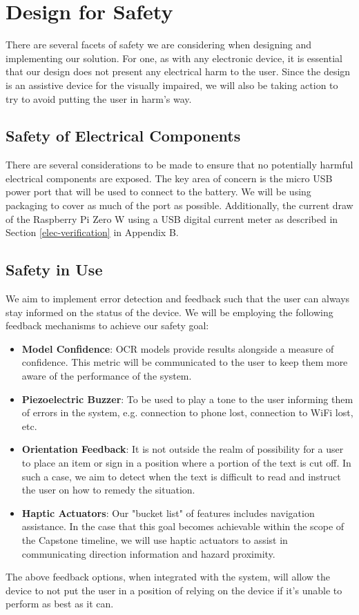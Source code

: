 \documentclass[a4paper,11pt]{article}
\begin{document}
\section{Design for Safety}
\noindent
There are several facets of safety we are considering when designing and implementing our solution. For one, as with any electronic device, it is essential that our design does not present any electrical harm to the user. Since the design is an assistive device for the visually impaired, we will also be taking action to try to avoid putting the user in harm's way.

\subsection{Safety of Electrical Components}
\noindent
There are several considerations to be made to ensure that no potentially harmful electrical components are exposed. The key area of concern is the micro USB power port that will be used to connect to the battery. We will be using packaging to cover as much of the port as possible. Additionally, the current draw of the Raspberry Pi Zero W using a USB digital current meter as described in Section \ref{elec-verification} in Appendix B.

\subsection{Safety in Use}
\noindent
We aim to implement error detection and feedback such that the user can always stay informed on the status of the device. We will be employing the following feedback mechanisms to achieve our safety goal:
\begin{itemize}
    \item \textbf{Model Confidence}: OCR models provide results alongside a measure of confidence. This metric will be communicated to the user to keep them more aware of the performance of the system.
    \item \textbf{Piezoelectric Buzzer}: To be used to play a tone to the user informing them of errors in the system, e.g. connection to phone lost, connection to WiFi lost, etc.
    \item \textbf{Orientation Feedback}: It is not outside the realm of possibility for a user to place an item or sign in a position where a portion of the text is cut off. In such a case, we aim to detect when the text is difficult to read and instruct the user on how to remedy the situation.
    \item \textbf{Haptic Actuators}: Our "bucket list" of features includes navigation assistance. In the case that this goal becomes achievable within the scope of the Capstone timeline, we will use haptic actuators to assist in communicating direction information and hazard proximity.
\end{itemize}
The above feedback options, when integrated with the system, will allow the device to not put the user in a position of relying on the device if it's unable to perform as best as it can.
\end{document}
